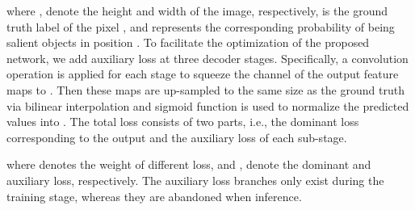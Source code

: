 \documentclass[letterpaper]{article} \usepackage{aaai20}  \usepackage{times}  \usepackage{helvet} \usepackage{courier}  \usepackage[hyphens]{url}  \usepackage{graphicx} \urlstyle{rm} \def\UrlFont{\rm}  \usepackage{graphicx}  \frenchspacing  \setlength{\pdfpagewidth}{8.5in}  \setlength{\pdfpageheight}{11in}
\begin{document}
where ,  denote the height and width of the image, respectively, 
 is the ground truth label of the pixel , and  
represents the corresponding probability of being salient objects in position . To facilitate the optimization of the proposed network, 
we add auxiliary loss at three decoder stages. Specifically, a  convolution operation is applied 
for each stage to squeeze the channel of the output feature maps to .
Then these maps are up-sampled to the same size as the ground truth via bilinear interpolation and sigmoid function is used to normalize the predicted values into .
The total loss consists of two parts, i.e., the dominant loss corresponding to the output
and the auxiliary loss of each sub-stage.

where  denotes the weight of different loss, and , 
 denote the dominant and auxiliary loss, respectively.
The auxiliary loss branches only exist during the training stage, whereas they are abandoned when inference.
\end{document}
